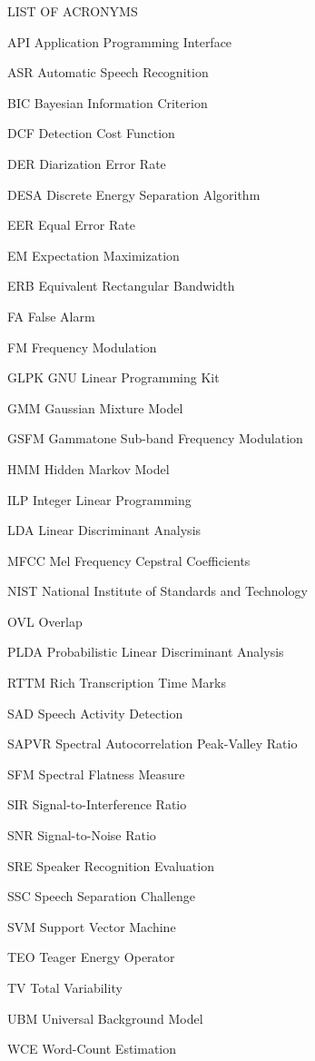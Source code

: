 \newpage
\begin{table}
	\caption{LIST OF ACRONYMS}
\end{table}
\begin{abbreviations}
	\item[API] Application Programming Interface
	\item[ASR] Automatic Speech Recognition
	\item[BIC] Bayesian Information Criterion
	\item[DCF] Detection Cost Function
	\item[DER] Diarization Error Rate
	\item[DESA] Discrete Energy Separation Algorithm
	\item[EER] Equal Error Rate
	\item[EM] Expectation Maximization
	\item[ERB] Equivalent Rectangular Bandwidth
	\item[FA] False Alarm
	\item[FM] Frequency Modulation
	\item[GLPK] GNU Linear Programming Kit
	\item[GMM] Gaussian Mixture Model
	\item[GSFM] Gammatone Sub-band Frequency Modulation
	\item[HMM] Hidden Markov Model
	\item[ILP] Integer Linear Programming
	\item[LDA] Linear Discriminant Analysis
	\item[MFCC] Mel Frequency Cepstral Coefficients
	\item[NIST] National Institute of Standards and Technology
	\item[OVL] Overlap
	\item[PLDA] Probabilistic Linear Discriminant Analysis
	\item[RTTM] Rich Transcription Time Marks
	\item[SAD] Speech Activity Detection
	\item[SAPVR] Spectral Autocorrelation Peak-Valley Ratio
	\item[SFM] Spectral Flatness Measure
	\item[SIR] Signal-to-Interference Ratio
	\item[SNR] Signal-to-Noise Ratio
	\item[SRE] Speaker Recognition Evaluation
	\item[SSC] Speech Separation Challenge
	\item[SVM] Support Vector Machine
	\item[TEO] Teager Energy Operator
	\item[TV] Total Variability
	\item[UBM] Universal Background Model
	\item[WCE] Word-Count Estimation
\end{abbreviations}
